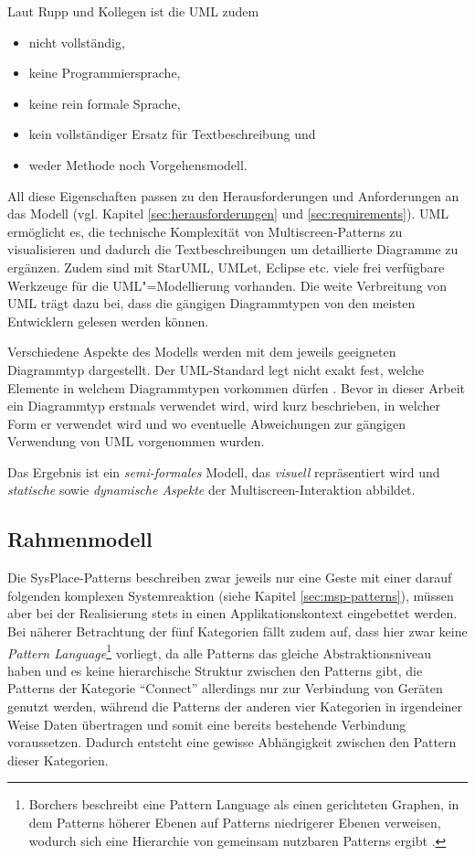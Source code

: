 Laut Rupp und Kollegen ist die \acs{UML} zudem \citep[4]{UML2012}
\begin{itemize}
\item nicht vollständig,
\item keine Programmiersprache,
\item keine rein formale Sprache,
\item kein vollständiger Ersatz für Textbeschreibung und
\item weder Methode noch Vorgehensmodell.
\end{itemize}
All diese Eigenschaften passen zu den Herausforderungen und Anforderungen an das Modell (vgl. Kapitel \ref{sec:herausforderungen} und \ref{sec:requirements}). UML ermöglicht es, die technische Komplexität von Multiscreen-Patterns zu visualisieren und dadurch die Textbeschreibungen um detaillierte Diagramme zu ergänzen. Zudem sind mit StarUML, UMLet, Eclipse etc. viele frei verfügbare Werkzeuge für die UML"=Modellierung vorhanden. Die weite Verbreitung von \ac{UML} trägt dazu bei, dass die gängigen Diagrammtypen von den meisten Entwicklern gelesen werden können. 

Verschiedene Aspekte des Modells werden mit dem jeweils geeigneten Diagrammtyp dargestellt. Der UML-Standard legt nicht exakt fest, welche Elemente in welchem Diagrammtypen vorkommen dürfen \citep[15]{UML2012}. Bevor in dieser Arbeit ein Diagrammtyp erstmals verwendet wird, wird kurz beschrieben, in welcher Form er verwendet wird und wo eventuelle Abweichungen zur gängigen Verwendung von UML vorgenommen wurden.

Das Ergebnis ist ein \textit{semi-formales} Modell, das \textit{visuell} repräsentiert wird und \textit{statische} sowie \textit{dynamische Aspekte} der Multiscreen-Interaktion abbildet.

\subsection{Rahmenmodell}
\label{subsec:model_overview}
Die SysPlace-Patterns beschreiben zwar jeweils nur eine Geste mit einer darauf folgenden komplexen Systemreaktion (siehe Kapitel \ref{sec:msp-patterns}), müssen aber bei der Realisierung stets in einen Applikationskontext eingebettet werden. Bei näherer Betrachtung der fünf Kategorien fällt zudem auf, dass hier zwar keine \textit{Pattern Language}\footnote{Borchers beschreibt eine Pattern Language als einen gerichteten Graphen, in dem Patterns höherer Ebenen auf Patterns niedrigerer Ebenen verweisen, wodurch sich eine Hierarchie von gemeinsam nutzbaren Patterns ergibt \citep{Borchers2000}.} vorliegt, da alle Patterns das gleiche Abstraktionsniveau haben und es keine hierarchische Struktur zwischen den Patterns gibt, die Patterns der Kategorie "`Connect"' allerdings nur zur Verbindung von Geräten genutzt werden, während die Patterns der anderen vier Kategorien in irgendeiner Weise Daten übertragen und somit eine bereits bestehende Verbindung voraussetzen. Dadurch entsteht eine gewisse Abhängigkeit zwischen den Pattern dieser Kategorien. 


